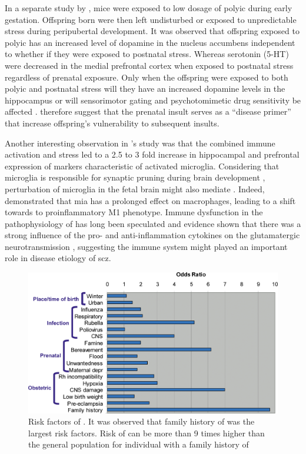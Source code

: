 	In a separate study by \citet{Giovanoli2013}, mice were exposed to low dosage of \gls{polyic} during early gestation.
	Offspring born were then left undisturbed or exposed to unpredictable stress during peripubertal development.
	It was observed that offspring exposed to \gls{polyic} has an increased level of dopamine in the nucleus accumbens independent to whether if they were exposed to postnatal stress.
	Whereas serotonin (5-HT) were decreased in the medial prefrontal cortex when exposed to postnatal stress regardless of prenatal exposure.
	Only when the offspring were exposed to both \gls{polyic} and postnatal stress will they have an increased dopamine levels in the hippocampus or will sensorimotor gating and psychotomimetic drug sensitivity be affected \citep{Giovanoli2013}.
	\citet{Giovanoli2013} therefore suggest that the prenatal insult serves as a ``disease primer'' that increase offspring's vulnerability to subsequent insults.
	
	Another interesting observation in \citet{Giovanoli2013}'s study was that the combined immune activation and stress led to a 2.5 to 3 fold increase in hippocampal and prefrontal expression of markers characteristic of activated microglia.
	Considering that microglia is responsible for synaptic pruning during brain development \citep{Paolicelli2011}, perturbation of microglia in the fetal brain might also mediate .
	Indeed, \citet{Onore2014} demonstrated that \gls{mia} has a prolonged effect on macrophages, leading to a shift towards to proinflammatory M1 phenotype.
	Immune dysfunction in the pathophysiology of  has long been speculated \citep{Muller2010a} and evidence shown that there was a strong influence of the pro- and anti-inflammation cytokines on the glutamatergic neurotransmission \citep{Muller2010a}, suggesting the immune system might played an important role in disease etiology of \gls{scz}.
	
	\begin{figure}
		\centering
		\includegraphics[width=\textwidth]{figure/risk_factors_of_schizophrenia.png}
		\caption[Risk factors of ]{Risk factors of .
			It was observed that family history of  was the largest risk factors.
			Risk of  can be more than 9 times higher than the general population for individual with a family history of }
		\label{fig:riskfactors}
	\end{figure}
	
